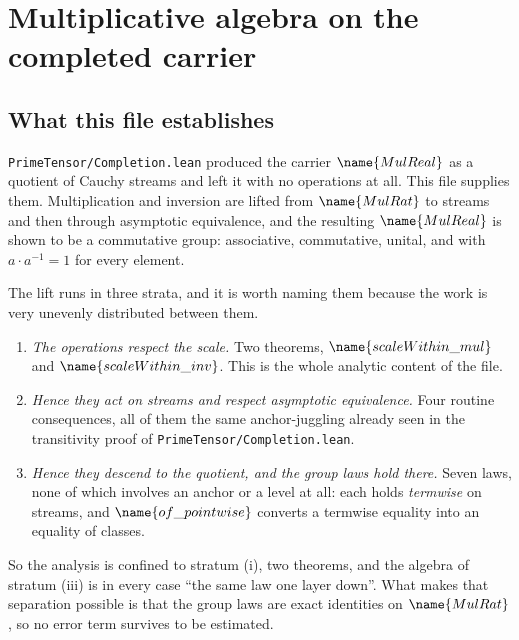 
\section{Multiplicative algebra on the completed carrier}
\label{Algebra:sec}


\subsection*{What this file establishes}

\texttt{PrimeTensor/Completion.lean} produced the carrier $\name{MulReal}$ as a
quotient of Cauchy streams and left it with no operations at all.  This file
supplies them.  Multiplication and inversion are lifted from $\name{MulRat}$
to streams and then through asymptotic equivalence, and the resulting
$\name{MulReal}$ is shown to be a commutative group: associative, commutative,
unital, and with $a \cdot a^{-1} = 1$ for every element.

The lift runs in three strata, and it is worth naming them because the work is
very unevenly distributed between them.

\begin{enumerate}[label=(\roman*)]
\item \emph{The operations respect the scale.}  Two theorems,
  $\name{scaleWithin\_mul}$ and $\name{scaleWithin\_inv}$.  This is the whole
  analytic content of the file.
\item \emph{Hence they act on streams and respect asymptotic equivalence.}
  Four routine consequences, all of them the same anchor-juggling already seen
  in the transitivity proof of \texttt{PrimeTensor/Completion.lean}.
\item \emph{Hence they descend to the quotient, and the group laws hold there.}
  Seven laws, none of which involves an anchor or a level at all: each holds
  \emph{termwise} on streams, and $\name{of\_pointwise}$ converts a termwise
  equality into an equality of classes.
\end{enumerate}

So the analysis is confined to stratum (i), two theorems, and the algebra of
stratum (iii) is in every case ``the same law one layer down''.  What makes
that separation possible is that the group laws are exact identities on
$\name{MulRat}$, so no error term survives to be estimated.

